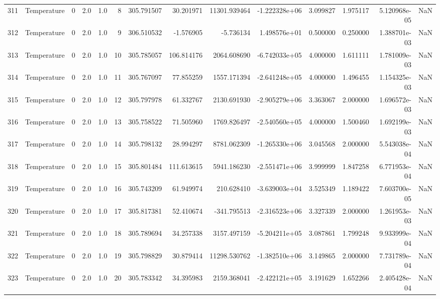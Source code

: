 \begin{tabular}{llrrrrrrrrrrrr}
311 &  Temperature &       0 &  2.0 &  1.0 &    8 &  305.791507 &    30.201971 &   11301.939464 & -1.222328e+06 &  3.099827 &  1.975117 &  5.120968e-05 &      NaN \\
312 &  Temperature &       0 &  2.0 &  1.0 &    9 &  306.510532 &    -1.576905 &      -5.736134 &  1.498576e+01 &  0.500000 &  0.250000 &  1.388701e-03 &      NaN \\
313 &  Temperature &       0 &  2.0 &  1.0 &   10 &  305.785057 &   106.814176 &    2064.608690 & -6.742033e+05 &  4.000000 &  1.611111 &  1.781009e-03 &      NaN \\
314 &  Temperature &       0 &  2.0 &  1.0 &   11 &  305.767097 &    77.855259 &    1557.171394 & -2.641248e+05 &  4.000000 &  1.496455 &  1.154325e-03 &      NaN \\
315 &  Temperature &       0 &  2.0 &  1.0 &   12 &  305.797978 &    61.332767 &    2130.691930 & -2.905279e+06 &  3.363067 &  2.000000 &  1.696572e-03 &      NaN \\
316 &  Temperature &       0 &  2.0 &  1.0 &   13 &  305.758522 &    71.505960 &    1769.826497 & -2.540560e+05 &  4.000000 &  1.500460 &  1.692199e-03 &      NaN \\
317 &  Temperature &       0 &  2.0 &  1.0 &   14 &  305.798132 &    28.994297 &    8781.062309 & -1.265330e+06 &  3.045568 &  2.000000 &  5.543038e-04 &      NaN \\
318 &  Temperature &       0 &  2.0 &  1.0 &   15 &  305.801484 &   111.613615 &    5941.186230 & -2.551471e+06 &  3.999999 &  1.847258 &  6.771953e-04 &      NaN \\
319 &  Temperature &       0 &  2.0 &  1.0 &   16 &  305.743209 &    61.949974 &     210.628410 & -3.639003e+04 &  3.525349 &  1.189422 &  7.603700e-05 &      NaN \\
320 &  Temperature &       0 &  2.0 &  1.0 &   17 &  305.817381 &    52.410674 &    -341.795513 & -2.316523e+06 &  3.327339 &  2.000000 &  1.261953e-03 &      NaN \\
321 &  Temperature &       0 &  2.0 &  1.0 &   18 &  305.789694 &    34.257338 &    3157.497159 & -5.204211e+05 &  3.087861 &  1.799248 &  9.933999e-04 &      NaN \\
322 &  Temperature &       0 &  2.0 &  1.0 &   19 &  305.798829 &    30.879414 &   11298.530762 & -1.382510e+06 &  3.149865 &  2.000000 &  7.731789e-04 &      NaN \\
323 &  Temperature &       0 &  2.0 &  1.0 &   20 &  305.783342 &    34.395983 &    2159.368041 & -2.422121e+05 &  3.191629 &  1.652266 &  2.405428e-04 &      NaN \\

\end{tabular}
